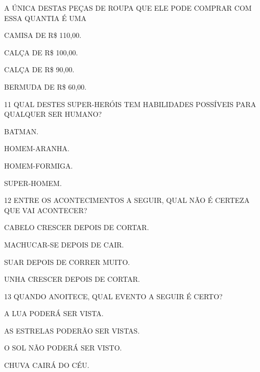 A ÚNICA DESTAS PEÇAS DE ROUPA QUE ELE PODE COMPRAR COM ESSA QUANTIA É UMA

\begin{escolha}
\item CAMISA DE R\$ 110,00.

\item CALÇA DE R\$ 100,00.

\item CALÇA DE R\$ 90,00.

\item BERMUDA DE R\$ 60,00.
\end{escolha}

\num{11} QUAL DESTES SUPER-HERÓIS TEM HABILIDADES POSSÍVEIS PARA QUALQUER SER HUMANO?

\begin{escolha}
\item BATMAN.

\item HOMEM-ARANHA.

\item HOMEM-FORMIGA.

\item SUPER-HOMEM.
\end{escolha}


\num{12} ENTRE OS ACONTECIMENTOS A SEGUIR, QUAL NÃO É CERTEZA QUE VAI
ACONTECER?

\begin{escolha}%
\item CABELO CRESCER DEPOIS DE CORTAR.

\item MACHUCAR-SE DEPOIS DE CAIR.

\item SUAR DEPOIS DE CORRER MUITO.

\item UNHA CRESCER DEPOIS DE CORTAR.
\end{escolha}

\num{13} QUANDO ANOITECE, QUAL EVENTO A SEGUIR É CERTO?

\begin{escolha}%
\item A LUA PODERÁ SER VISTA.

\item AS ESTRELAS PODERÃO SER VISTAS.

\item O SOL NÃO PODERÁ SER VISTO.

\item CHUVA CAIRÁ DO CÉU.
\end{escolha}

